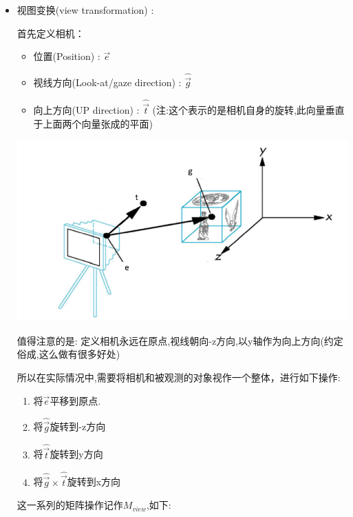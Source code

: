 {{{      \begin{itemize}
        \item {
              视图变换(view transformation) :

              首先定义相机：
              \begin{itemize}
                \item 位置(Position) : $\vec{e}$
                \item 视线方向(Look-at/gaze direction) : $\hat{\vec{g}}$
                \item 向上方向(UP direction) : $\hat{\vec{t}}$ (注:这个表示的是相机自身的旋转,此向量垂直于上面两个向量张成的平面)
              \end{itemize}

              \includegraphics[scale=0.9]{resources/viewTransformation.png}

              值得注意的是: 定义相机永远在原点,视线朝向-z方向,以y轴作为向上方向(约定俗成,这么做有很多好处)

              所以在实际情况中,需要将相机和被观测的对象视作一个整体，进行如下操作:
              \begin{enumerate}
                \item 将$\vec{e}$平移到原点.
                \item 将$\hat{\vec{g}}$旋转到-z方向
                \item 将$\hat{\vec{t}}$旋转到y方向
                \item 将$\hat{\vec{g}} \times \hat{\vec{t}}$旋转到x方向
              \end{enumerate}

              这一系列的矩阵操作记作$M_{view}$,如下:

}
\end{itemize}}}}
